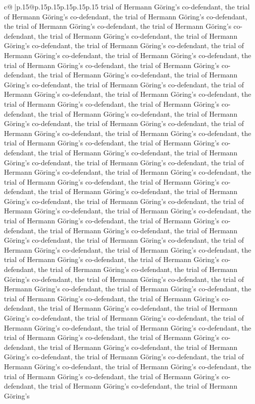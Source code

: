 \documentclass{article}
\begin{document}
{\begin{supertabular}{c@{$\;$}|p{.15\linewidth}@{}p{.15\linewidth}p{.15\linewidth}p{.15\linewidth}p{.15\linewidth}p{.15\linewidth}}
{{{trial of Hermann Göring's co{-}defendant, the trial of Hermann Göring's co{-}defendant, the trial of Hermann Göring's co{-}defendant, the trial of Hermann Göring's co{-}defendant, the trial of Hermann Göring's co{-}defendant, the trial of Hermann Göring's co{-}defendant, the trial of Hermann Göring's co{-}defendant, the trial of Hermann Göring's co{-}defendant, the trial of Hermann Göring's co{-}defendant, the trial of Hermann Göring's co{-}defendant, the trial of Hermann Göring's co{-}defendant, the trial of Hermann Göring's co{-}defendant, the trial of Hermann Göring's co{-}defendant, the trial of Hermann Göring's co{-}defendant, the trial of Hermann Göring's co{-}defendant, the trial of Hermann Göring's co{-}defendant, the trial of Hermann Göring's co{-}defendant, the trial of Hermann Göring's co{-}defendant, the trial of Hermann Göring's co{-}defendant, the trial of Hermann Göring's co{-}defendant, the trial of Hermann Göring's co{-}defendant, the trial of Hermann Göring's co{-}defendant, the trial of Hermann Göring's co{-}defendant, the trial of Hermann Göring's co{-}defendant, the trial of Hermann Göring's co{-}defendant, the trial of Hermann Göring's co{-}defendant, the trial of Hermann Göring's co{-}defendant, the trial of Hermann Göring's co{-}defendant, the trial of Hermann Göring's co{-}defendant, the trial of Hermann Göring's co{-}defendant, the trial of Hermann Göring's co{-}defendant, the trial of Hermann Göring's co{-}defendant, the trial of Hermann Göring's co{-}defendant, the trial of Hermann Göring's co{-}defendant, the trial of Hermann Göring's co{-}defendant, the trial of Hermann Göring's co{-}defendant, the trial of Hermann Göring's co{-}defendant, the trial of Hermann Göring's co{-}defendant, the trial of Hermann Göring's co{-}defendant, the trial of Hermann Göring's co{-}defendant, the trial of Hermann Göring's co{-}defendant, the trial of Hermann Göring's co{-}defendant, the trial of Hermann Göring's co{-}defendant, the trial of Hermann Göring's co{-}defendant, the trial of Hermann Göring's co{-}defendant, the trial of Hermann Göring's co{-}defendant, the trial of Hermann Göring's co{-}defendant, the trial of Hermann Göring's co{-}defendant, the trial of Hermann Göring's co{-}defendant, the trial of Hermann Göring's co{-}defendant, the trial of Hermann Göring's co{-}defendant, the trial of Hermann Göring's co{-}defendant, the trial of Hermann Göring's co{-}defendant, the trial of Hermann Göring's co{-}defendant, the trial of Hermann Göring's co{-}defendant, the trial of Hermann Göring's co{-}defendant, the trial of Hermann Göring's co{-}defendant, the trial of Hermann Göring's co{-}defendant, the trial of Hermann Göring's co{-}defendant, the trial of Hermann Göring's co{-}defendant, the trial of Hermann Göring's co{-}defendant, the trial of Hermann Göring's co{-}defendant, the trial of Hermann Göring's co{-}defendant, the trial of Hermann Göring's co{-}defendant, the trial of Hermann Göring's co{-}defendant, the trial of Hermann Göring's co{-}defendant, the trial of Hermann Göring's co{-}defendant, the trial of Hermann Göring's co{-}defendant, the trial of Hermann Göring's co{-}defendant, the trial of Hermann Göring's }}}
\end{supertabular}}
\end{document}
